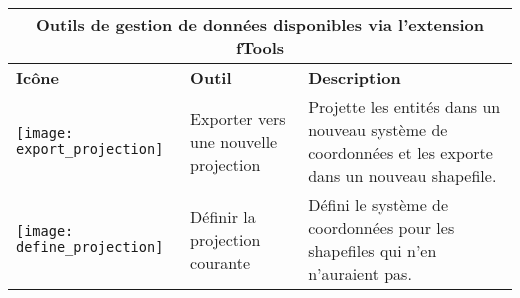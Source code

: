 \begin{table}[ht]
\centering
\begin{tabular}{|m{1cm}|m{3cm}|m{12cm}|}
 \hline \multicolumn{3}{|c|}{\textbf{Outils de gestion de données disponibles via l'extension fTools}} \\
 \hline \textbf{Icône} & \textbf{Outil} & \textbf{Description} \\
 \hline \texttt{[image: export\_projection]} & Exporter vers une nouvelle projection & Projette les entités dans un nouveau système de coordonnées et les exporte dans un nouveau shapefile. \\
 \hline \texttt{[image: define\_projection]} & Définir la projection courante & Défini le système de coordonnées pour les shapefiles qui n'en n'auraient pas. \\

\end{tabular}
\end{table}
